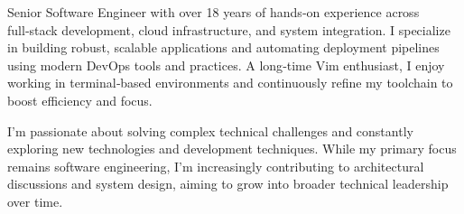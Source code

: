 

\begin{cvparagraph}

Senior Software Engineer with over 18 years of hands‑on experience across full‑stack development, cloud infrastructure, and system integration. I specialize in building robust, scalable applications and automating deployment pipelines using modern DevOps tools and practices. A long‑time Vim enthusiast, I enjoy working in terminal‑based environments and continuously refine my toolchain to boost efficiency and focus.

I’m passionate about solving complex technical challenges and constantly exploring new technologies and development techniques. While my primary focus remains software engineering, I’m increasingly contributing to architectural discussions and system design, aiming to grow into broader technical leadership over time.
\end{cvparagraph}
